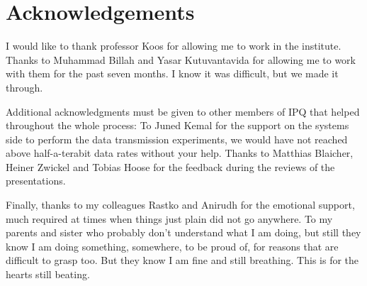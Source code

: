 
\chapter{Acknowledgements}
\label{ch:ack}


I would like to thank professor Koos for allowing me to work in the institute. Thanks to Muhammad Billah and Yasar Kutuvantavida for allowing me to work with them for the past seven months. I know it was difficult, but we made it through.

Additional acknowledgments must be given to other members of IPQ that helped throughout the whole process: To Juned Kemal for the support on the systems side to perform the data transmission experiments, we would have not reached above half-a-terabit data rates without your help. Thanks to Matthias Blaicher, Heiner Zwickel and Tobias Hoose for the feedback during the reviews of the presentations. 

Finally, thanks to my colleagues Rastko and Anirudh for the emotional support, much required at times when things just plain did not go anywhere. To my parents and sister who probably don't understand what I am doing, but still they know I am doing something, somewhere, to be proud of, for reasons that are difficult to grasp too. But they know I am fine and still breathing. This is for the hearts still beating.



